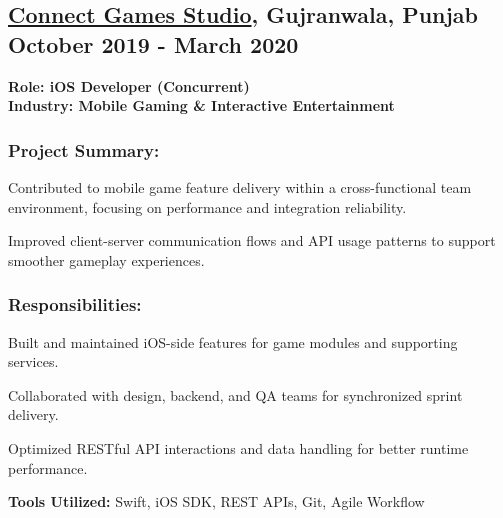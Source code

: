 \subsection{\textbf{\href{https://www.linkedin.com/company/connect-games-studio/}{Connect Games Studio}, Gujranwala, Punjab} \hfill October 2019 - March 2020}
\noindent\textbf{Role: iOS Developer (Concurrent)}\\
\noindent\textbf{Industry: Mobile Gaming \& Interactive Entertainment}

\subsubsection*{\textbf{Project Summary:}}
\begin{zitemize}
\item Contributed to mobile game feature delivery within a cross-functional team environment, focusing on performance and integration reliability.
\item Improved client-server communication flows and API usage patterns to support smoother gameplay experiences.
\end{zitemize}

\subsubsection*{\textbf{Responsibilities:}}
\begin{zitemize}
\item Built and maintained iOS-side features for game modules and supporting services.
\item Collaborated with design, backend, and QA teams for synchronized sprint delivery.
\item Optimized RESTful API interactions and data handling for better runtime performance.
\end{zitemize}

\noindent\textbf{Tools Utilized:} Swift, iOS SDK, REST APIs, Git, Agile Workflow
